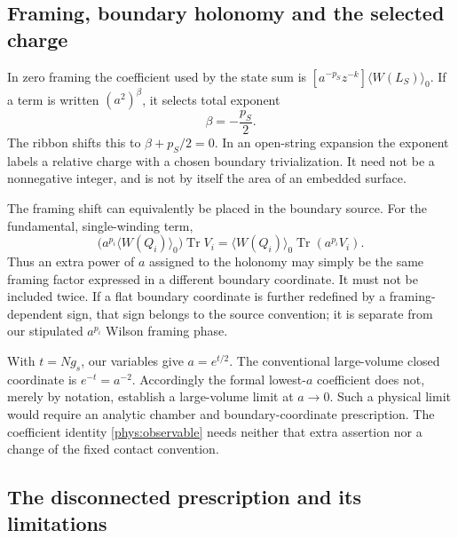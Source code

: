 \documentclass[11pt,letterpaper]{article}
\numberwithin{equation}{section}
\theoremstyle{definition}
\theoremstyle{remark}
\begin{document}
\subsection{Framing, boundary holonomy and the selected charge}

In zero framing the coefficient used by the state sum is
$[a^{-p_S}z^{-k}]\langle W(L_S)\rangle_0$. If a term is written
$(a^2)^{\beta}$, it selects total exponent
\begin{equation}
 \beta=-\frac{p_S}{2}.
 \label{phys:selected-charge}
\end{equation}
The ribbon shifts this to $\beta+p_S/2=0$. In an open-string expansion
the exponent labels a relative charge with a chosen boundary
trivialization. It need not be a nonnegative integer, and is not by
itself the area of an embedded surface.

The framing shift can equivalently be placed in the boundary source.
For the fundamental, single-winding term,
\begin{equation}
 \bigl(a^{p_i}\langle W(Q_i)\rangle_0\bigr)
        \operatorname{Tr}V_i
 =\langle W(Q_i)\rangle_0
        \operatorname{Tr}(a^{p_i}V_i).
 \label{phys:source-shift}
\end{equation}
Thus an extra power of $a$ assigned to the holonomy may simply be the
same framing factor expressed in a different boundary coordinate. It
must not be included twice. If a flat boundary coordinate is further
redefined by a framing-dependent sign, that sign belongs to the source
convention; it is separate from our stipulated $a^{p_i}$ Wilson framing
phase.

With $t=Ng_s$, our variables give $a=e^{t/2}$. The conventional
large-volume closed coordinate is $e^{-t}=a^{-2}$. Accordingly the
formal lowest-$a$ coefficient does not, merely by notation, establish a
large-volume limit at $a\to0$. Such a physical limit would require an
analytic chamber and boundary-coordinate prescription. The coefficient
identity \eqref{phys:observable} needs neither that extra assertion nor
a change of the fixed contact convention.

\subsection{The disconnected prescription and its limitations}
\end{document}
